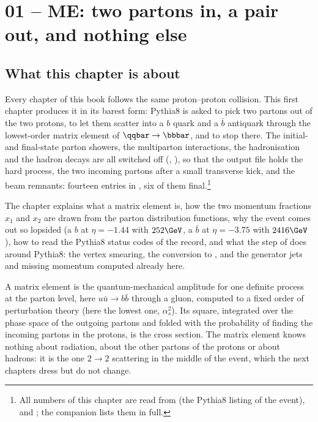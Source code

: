 \chapter{01 -- ME: two partons in, a \bbbar{} pair out, and nothing else}
\label{ch:01_ME}

\section{What this chapter is about}

Every chapter of this book follows the same proton--proton collision. This first chapter produces it in its
barest form: Pythia8 is asked to pick two partons out of the two protons, to let them scatter into a
$b$ quark and a $\bar b$ antiquark through the lowest-order matrix element of $\qqbar\to\bbbar$, and to stop
there. The initial- and final-state parton showers, the multiparton interactions, the hadronisation and
the hadron decays are all switched off (, ),
so that the output file holds the hard process, the two incoming partons after a small transverse kick,
and the beam remnants: fourteen entries in , six of them final.\footnote{All numbers of
this chapter are read from  (the Pythia8 listing of the event),
 and ; the companion
 lists them in full.}

The chapter explains what a matrix element is, how the two momentum fractions $x_1$ and $x_2$ are drawn
from the parton distribution functions, why the event comes out so lopsided (a $b$ at $\eta=-1.44$ with
$252\GeV$, a $\bar b$ at $\eta=-3.75$ with $2416\GeV$), how to read the Pythia8 status codes of the
record, and what the  step of  does around Pythia8: the vertex smearing, the
conversion to , and the generator jets and missing momentum computed already here.

\begin{plainwords}
A matrix element is the quantum-mechanical amplitude for one definite process at the parton level, here
$u\bar u\to b\bar b$ through a gluon, computed to a fixed order of perturbation theory (here the lowest
one, $\alpha_s^2$). Its square, integrated over the phase space of the outgoing partons and folded with
the probability of finding the incoming partons in the protons, is the cross section. The matrix element
knows nothing about radiation, about the other partons of the protons or about hadrons: it is the one
$2\to2$ scattering in the middle of the event, which the next chapters dress but do not change.
\end{plainwords}

